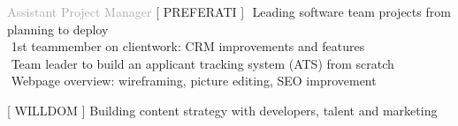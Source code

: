 
\begin{cvtable}

\bigskip

{\textcolor{darkgray}{Assistant Project Manager}}%
{[ {P\scriptsize REFERATI} ]}%
{%
     \textperiodcentered $ $ Leading software team projects from planning to deploy \\
     \textperiodcentered $ $ 1st teammember on clientwork: CRM improvements and features \\
     \textperiodcentered $ $ Team leader to build an applicant tracking system (ATS) from scratch \\
     \textperiodcentered $ $ Webpage overview: wireframing, picture editing, SEO improvement
} %
 
\bigskip
 
{\textcolor{darkgray}{}}%
{[ {W\scriptsize ILL}{D\scriptsize OM} ]}%
{%
    Building content strategy
    with developers, talent and marketing %
} 

\bigskip


\end{cvtable}
